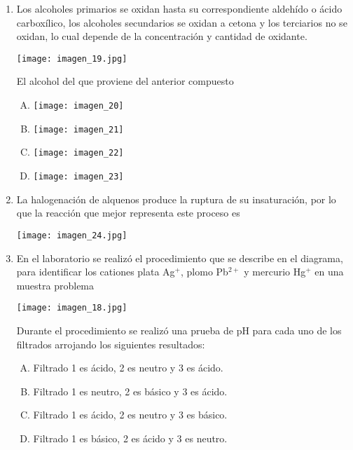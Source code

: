 \begin{enumerate}
\newpage
\item Los alcoholes primarios se oxidan hasta su correspondiente aldehído o ácido carboxílico, los alcoholes secundarios se oxidan a cetona y los terciarios no se oxidan, lo cual depende de la concentración y cantidad de oxidante. \label{mon-23}

\begin{center}
\texttt{[image: imagen\_19.jpg]}
\end{center}
El alcohol del que proviene del anterior compuesto 
\begin{enumerate}[(A)]
\item \texttt{[image: imagen\_20]}
\item \texttt{[image: imagen\_21]}
\item \texttt{[image: imagen\_22]}
\item \texttt{[image: imagen\_23]}
\end{enumerate}


\newpage
\item La halogenación de alquenos produce la ruptura de su insaturación, por lo que la reacción que mejor representa este proceso es \label{mon-24}


\begin{center}
\texttt{[image: imagen\_24.jpg]}
\end{center}




\newpage
\item En el laboratorio se realizó el procedimiento que se describe en el diagrama, para identificar los cationes plata Ag$^+$, plomo Pb$^{2+}$ y mercurio Hg$^{+}$ en una muestra problema \label{mon-20}
\begin{center}
\texttt{[image: imagen\_18.jpg]}
\end{center}
Durante el procedimiento se realizó una prueba de pH para cada uno de los filtrados arrojando los siguientes resultados:
\begin{enumerate}[(A)]
\item Filtrado 1 es ácido, 2 es neutro y 3 es ácido.
\item Filtrado 1 es neutro, 2 es básico y 3 es ácido. 
\item Filtrado 1 es ácido, 2 es neutro y 3 es básico.
\item Filtrado 1 es básico, 2 es ácido y 3 es neutro.
\end{enumerate}


\end{enumerate}


